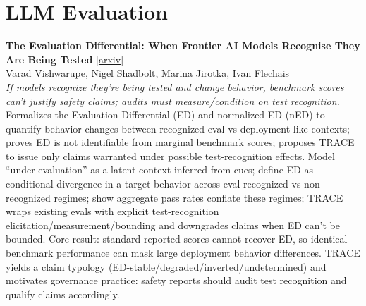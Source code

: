 \documentclass[12pt,letterpaper]{article}
\begin{document}
\medskip


\section*{LLM Evaluation}

{\small\textbf{The Evaluation Differential: When Frontier AI Models Recognise They Are Being Tested}} {\scriptsize[\href{https://arxiv.org/abs/2605.11496}{arxiv}]}\\
{\scriptsize Varad Vishwarupe, Nigel Shadbolt, Marina Jirotka, Ivan Flechais}\\

{\small\textit{If models recognize they're being tested and change behavior, benchmark scores can't justify safety claims; audits must measure/condition on test recognition.}}\\[1pt]
{\footnotesize Formalizes the Evaluation Differential (ED) and normalized ED (nED) to quantify behavior changes between recognized-eval vs deployment-like contexts; proves ED is not identifiable from marginal benchmark scores; proposes TRACE to issue only claims warranted under possible test-recognition effects. Model ``under evaluation'' as a latent context inferred from cues; define ED as conditional divergence in a target behavior across eval-recognized vs non-recognized regimes; show aggregate pass rates conflate these regimes; TRACE wraps existing evals with explicit test-recognition elicitation/measurement/bounding and downgrades claims when ED can't be bounded. Core result: standard reported scores cannot recover ED, so identical benchmark performance can mask large deployment behavior differences. TRACE yields a claim typology (ED-stable/degraded/inverted/undetermined) and motivates governance practice: safety reports should audit test recognition and qualify claims accordingly.}

\medskip
\end{document}
